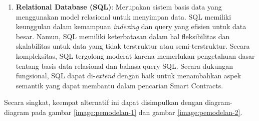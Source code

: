 \begin{enumerate}
    \item \textbf{Relational Database (SQL)}: Merupakan sistem basis data yang menggunakan model relasional untuk menyimpan data. SQL memiliki keunggulan dalam kemampuan \textit{indexing} dan query yang efisien untuk data besar. Namun, SQL memiliki keterbatasan dalam hal fleksibilitas dan skalabilitas untuk data yang tidak terstruktur atau semi-terstruktur. Secara kompleksitas, SQL tergolong moderat karena memerlukan pengetahuan dasar tentang basis data relasional dan bahasa query SQL. Secara dukungan fungsional, SQL dapat di-\textit{extend} dengan baik untuk menambahkan aspek semantik yang dapat membantu dalam pencarian Smart Contracts.
\end{enumerate}

Secara singkat, keempat alternatif ini dapat disimpulkan dengan diagram-diagram pada gambar \ref{image:pemodelan-1} dan gambar \ref{image:pemodelan-2}.
